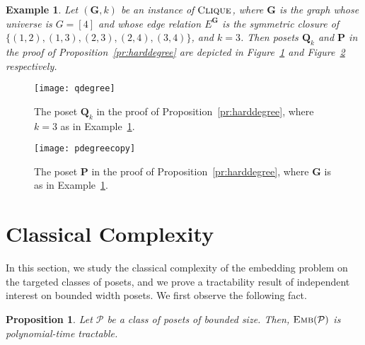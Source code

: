 \documentclass[usletter]{article}
\newcommand{\longversion}[1]{#1}
\newcommand{\shortversion}[1]{}
\newcommand{\longshort}[2]{\longversion{#1}\shortversion{#2}}
\newcommand{\pp}{\mathbf{P}}
\newcommand{\qq}{\mathbf{Q}}
\newtheorem{proposition}{Proposition}
\newtheorem{example}{Example}
\begin{document}
\longversion{\pfharddegree}


\newcommand{\exdegree}[0]{

\begin{example}\label{ex:degree}
Let $(\mathbf{G},k)$ be an instance of $\textsc{Clique}$, 
where $\mathbf{G}$ is the graph whose universe is $G=[4]$ 
and whose edge relation $E^\mathbf{G}$ is the symmetric closure of 
$\{(1,2),(1,3),(2,3),(2,4),(3,4)\}$, and $k=3$.  Then posets 
$\qq_k$ and $\pp$ in the proof of Proposition~\ref{pr:harddegree} 
are depicted in Figure~\ref{fig:qdegree} and Figure~\ref{fig:pdegree} respectively.
\end{example}}

\longversion{\exdegree}

\newcommand{\figqdegree}[0]{
\begin{figure}[h]
\centering
\texttt{[image: qdegree]}
\caption{The poset $\qq_k$ in the proof of Proposition~\ref{pr:harddegree}, 
where $k=3$ as in Example~\ref{ex:degree}.}
\label{fig:qdegree}
\end{figure}}

\longversion{\figqdegree}

\newcommand{\figpdegree}[0]{
\begin{figure}[h]
\centering
\texttt{[image: pdegreecopy]}
\caption{The poset $\pp$ in the proof of Proposition~\ref{pr:harddegree}, 
where $\mathbf{G}$ is as in Example~\ref{ex:degree}.}
\label{fig:pdegree}
\end{figure}}

\longversion{\figpdegree}



\section{Classical Complexity}\label{sect:classical}
In this section, we study the classical complexity of 
the embedding problem on the targeted classes of posets, 
and we prove a tractability result of independent interest 
on bounded width posets. We first observe the following fact.  

\longshort{\begin{proposition}}{\begin{proposition}[$\star$]}
\label{th:wdtract}
Let $\mathcal{P}$ be a class of posets of bounded size.  Then, 
$\textsc{Emb}(\mathcal{P})$ is polynomial-time tractable.
\end{proposition}

\newcommand{\pfwdtract}[0]{

\begin{proof}
Let $s \in \mathbb{N}$ be such that $|\pp| \leq s$ for all $\pp \in \mathcal{P}$.  
Let $(\mathbf{Q},\mathbf{P})$ be an instance of $\textsc{Emb}(\mathcal{P})$.  
If $|Q|>|P|$, reject.  Otherwise, check whether one of the at most $s^s$ many 
mappings from $\mathbf{Q}$ to $\mathbf{P}$ is an embedding.  
\end{proof}}
\end{document}
